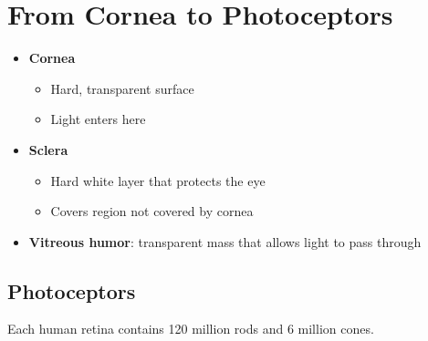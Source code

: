 \section{From Cornea to Photoceptors}

\begin{itemize}
  \item \textbf{Cornea}
  \begin{itemize}
    \item Hard, transparent surface
    \item Light enters here
  \end{itemize}

  \item \textbf{Sclera}
  \begin{itemize}
    \item Hard white layer that protects the eye
    \item Covers region not covered by cornea
  \end{itemize}

  \item \textbf{Vitreous humor}: transparent mass that allows light to pass
  through
\end{itemize}

\subsection{Photoceptors}

  Each human retina contains 120 million rods and 6 million cones.

